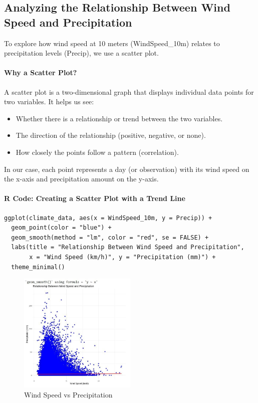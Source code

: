 \subsection*{Analyzing the Relationship Between Wind Speed and Precipitation}

To explore how wind speed at 10 meters (WindSpeed\_10m) relates to precipitation levels (Precip), we use a scatter plot.

\paragraph{Why a Scatter Plot?}

A scatter plot is a two-dimensional graph that displays individual data points for two variables. It helps us see:
\begin{itemize}
    \item Whether there is a relationship or trend between the two variables.
    \item The direction of the relationship (positive, negative, or none).
    \item How closely the points follow a pattern (correlation).
\end{itemize}

In our case, each point represents a day (or observation) with its wind speed on the x-axis and precipitation amount on the y-axis.

\paragraph{R Code: Creating a Scatter Plot with a Trend Line}

\begin{verbatim}
ggplot(climate_data, aes(x = WindSpeed_10m, y = Precip)) +
  geom_point(color = "blue") +
  geom_smooth(method = "lm", color = "red", se = FALSE) +
  labs(title = "Relationship Between Wind Speed and Precipitation",
       x = "Wind Speed (km/h)", y = "Precipitation (mm)") +
  theme_minimal()
\end{verbatim}

\begin{figure}[h]
\centering
\includegraphics[width=0.5\textwidth]{figures/scatter2.jpg}
\caption{Wind Speed vs Precipitation}
\end{figure}

